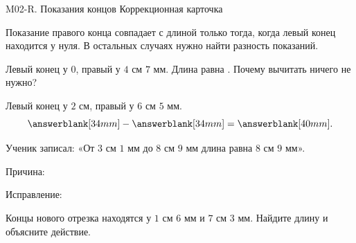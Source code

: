 \worksheettitle
  {M02-R. Показания концов}
  { Коррекционная карточка}

\studentnameblock

\begin{warningbox}
  Показание правого конца совпадает с длиной только тогда, когда левый конец
  находится у нуля. В остальных случаях нужно найти разность показаний.
\end{warningbox}

\begin{practicebox}
  Левый конец у $0$, правый у $4\text{ см }7\text{ мм}$.
  Длина равна \answerblank[45mm]. Почему вычитать ничего не нужно?
  \answerblank[75mm]
\end{practicebox}

\begin{practicebox}
  Левый конец у $2\text{ см}$, правый у $6\text{ см }5\text{ мм}$.
  \[
    \answerblank[34mm]-\answerblank[34mm]=\answerblank[40mm].
  \]
\end{practicebox}

\begin{practicebox}
  Ученик записал: «От $3\text{ см }1\text{ мм}$ до
  $8\text{ см }9\text{ мм}$ длина равна $8\text{ см }9\text{ мм}$».

  Причина: \answerblank[95mm]

  Исправление: \answerblank[95mm]
\end{practicebox}

\begin{checkpointbox}
  Концы нового отрезка находятся у $1\text{ см }6\text{ мм}$ и
  $7\text{ см }3\text{ мм}$. Найдите длину и объясните действие.
\end{checkpointbox}
